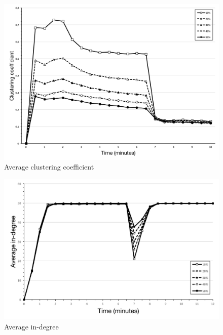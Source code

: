 \begin{figure}[ht]
  \centering
  \includegraphics[keepaspectratio=true, width=\textwidth]{images/average_clustering_coefficient}\caption{Average clustering coefficient}
  \label{fig:average_clustering_coefficient}
\end{figure}

\begin{figure}[ht]
  \centering
  \includegraphics[keepaspectratio=true, width=\textwidth]{images/average_indegree}\caption{Average in-degree}
  \label{fig:average_indegree}
\end{figure}


